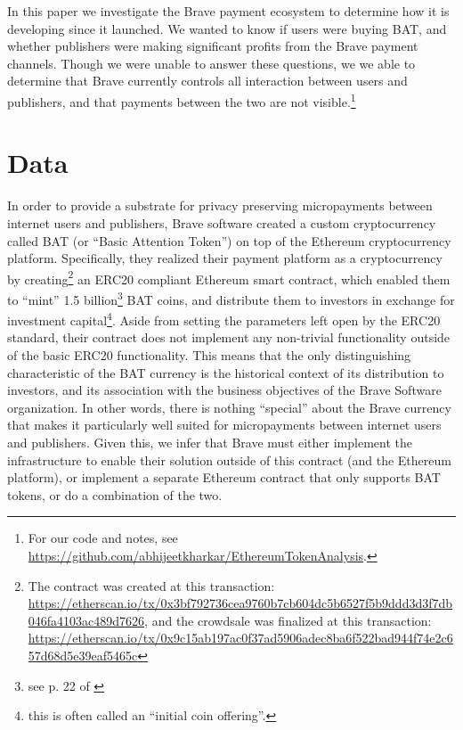 \documentclass[sigconf]{acmart}
\begin{document}
In this paper we investigate the Brave payment ecosystem
to determine how it is developing since it launched.
We wanted to know if users were buying BAT,
and whether publishers were making significant profits
from the Brave payment channels.
Though we were unable to answer these questions,
we we able to determine that Brave currently
controls all interaction between users and publishers,
and that payments between the two are not
visible.\footnote{
For our code and notes, see \url{https://github.com/abhijeetkharkar/EthereumTokenAnalysis}.
}


\section{Data}
In order to provide a substrate for privacy preserving
micropayments between internet users and publishers,
Brave software created a custom cryptocurrency called
BAT (or ``Basic Attention Token'') on top of the
Ethereum cryptocurrency platform. Specifically,
they realized their payment platform
as a cryptocurrency by
creating\footnote{The contract was created at
this transaction: \url{https://etherscan.io/tx/0x3bf792736cea9760b7cb604dc5b6527f5b9ddd3d3f7db046fa4103ac489d7626},
and the crowdsale was finalized at this transaction:
\url{https://etherscan.io/tx/0x9c15ab197ac0f37ad5906adec8ba6f522bad944f74e2c657d68d5e39eaf5465c}}
an ERC20\cite{ERC20} compliant
Ethereum smart contract\cite{BAT-contract}, which
enabled them to ``mint'' 1.5
billion\footnote{see p. 22 of \cite{BAT-wp}}
BAT coins, and distribute them to investors
in exchange for investment
capital\footnote{this is often called an ``initial coin offering''.}.
Aside from setting the parameters left open by
the ERC20 standard, their contract does not implement
any non-trivial functionality outside of the
basic ERC20 functionality.
This means that the only distinguishing characteristic
of the BAT currency is the historical
context of its distribution to investors,
and its association with the business objectives
of the Brave Software organization.
In other words, there is nothing ``special'' about
the Brave currency that makes it particularly
well suited for micropayments between internet users and publishers.
Given this, we infer that Brave must either implement
the infrastructure to enable their solution outside of this
contract (and the Ethereum platform), or implement
a separate Ethereum contract that only supports BAT tokens,
or do a combination of the two.
\end{document}
